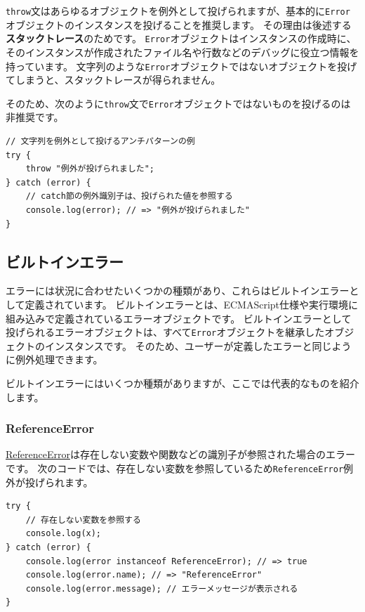 \texttt{throw}文はあらゆるオブジェクトを例外として投げられますが、基本的に\texttt{Error}オブジェクトのインスタンスを投げることを推奨します。
その理由は後述する\textbf{スタックトレース}のためです。
\texttt{Error}オブジェクトはインスタンスの作成時に、そのインスタンスが作成されたファイル名や行数などのデバッグに役立つ情報を持っています。
文字列のような\texttt{Error}オブジェクトではないオブジェクトを投げてしまうと、スタックトレースが得られません。

そのため、次のように\texttt{throw}文で\texttt{Error}オブジェクトではないものを投げるのは非推奨です。

\begin{lstlisting}
// 文字列を例外として投げるアンチパターンの例
try {
    throw "例外が投げられました";
} catch (error) {
    // catch節の例外識別子は、投げられた値を参照する
    console.log(error); // => "例外が投げられました"
}
\end{lstlisting}

\hypertarget{built-in-error}{%
\subsection{ビルトインエラー}\label{built-in-error}}

エラーには状況に合わせたいくつかの種類があり、これらはビルトインエラーとして定義されています。
ビルトインエラーとは、ECMAScript仕様や実行環境に組み込みで定義されているエラーオブジェクトです。
ビルトインエラーとして投げられるエラーオブジェクトは、すべて\texttt{Error}オブジェクトを継承したオブジェクトのインスタンスです。
そのため、ユーザーが定義したエラーと同じように例外処理できます。

ビルトインエラーにはいくつか種類がありますが、ここでは代表的なものを紹介します。

\hypertarget{reference-error}{%
\subsubsection{ReferenceError}\label{reference-error}}

\href{https://developer.mozilla.org/ja/docs/Web/JavaScript/Reference/Global_Objects/ReferenceError}{ReferenceError}は存在しない変数や関数などの識別子が参照された場合のエラーです。
次のコードでは、存在しない変数を参照しているため\texttt{ReferenceError}例外が投げられます。

\begin{lstlisting}
try {
    // 存在しない変数を参照する
    console.log(x);
} catch (error) {
    console.log(error instanceof ReferenceError); // => true
    console.log(error.name); // => "ReferenceError"
    console.log(error.message); // エラーメッセージが表示される
}
\end{lstlisting}

